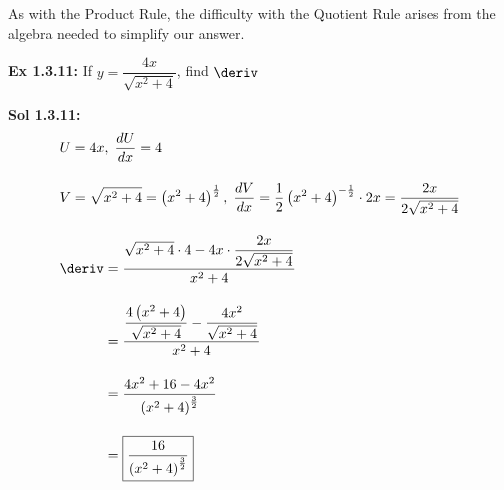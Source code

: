 As with the Product Rule, the difficulty with the Quotient Rule arises from the algebra needed to simplify our answer. \par

\begin{tcolorbox}[example]
    \textbf{Ex 1.3.11: } If $y = \dfrac{4x}{\sqrt{x^2 + 4}}$, find $\deriv$ 
\end{tcolorbox}
\begin{tcolorbox}[solution]
    \textbf{Sol 1.3.11: } \begin{align*}
        & U = 4x, \; \dfrac{dU}{dx} = 4 \\[11pt]
        & V = \sqrt{x^2 + 4} = \left(x^2 + 4\right)^\frac{1}{2}, \; \dfrac{dV}{dx} = \dfrac{1}{2}\left(x^2 + 4\right)^{-\frac{1}{2}} \cdot 2x = \dfrac{2x}{2\sqrt{x^2 + 4}} \\[11pt]
        & \deriv \begin{aligned}[t]
            & = \dfrac{\sqrt{x^2 + 4} \cdot 4 - 4x \cdot \dfrac{2x}{2\sqrt{x^2 + 4}}}{x^2 + 4} \\[11pt]
            & = \dfrac{\dfrac{4\left(x^2 + 4\right)}{\sqrt{x^2 + 4}} - \dfrac{4x^2}{\sqrt{x^2 + 4}}}{x^2 + 4} \\[11pt]
            & = \dfrac{4x^2 + 16 - 4x^2}{\left(x^2 + 4\right)^\frac{3}{2}} \\[11pt]
            & = \boxed{\dfrac{16}{\left(x^2 + 4\right)^\frac{3}{2}}}
        \end{aligned}
    \end{align*}
\end{tcolorbox} \vspace{11pt}

